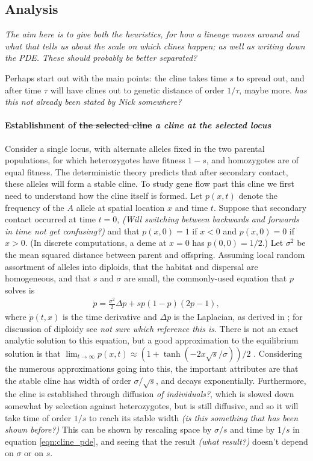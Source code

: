 \documentclass[12pt]{article}
\newcommand{\alisa}[1]{{\em \color{red} #1}}
\newcommand{\plr}[1]{{\em \color{blue} #1}}
\begin{document}
\subsection*{Analysis}

\plr{The aim here is to give both the heuristics, for how a lineage moves around
and what that tells us about the scale on which clines happen;
as well as writing down the PDE.  These should probably be better separated?}

Perhaps start out with the main points:
the cline takes time $s$ to spread out,
and after time $\tau$ will have clines out to genetic distance of order $1/\tau$,
maybe more. \alisa{has this not already been stated by Nick somewhere?}

\paragraph{Establishment of  \sout{the selected cline} \alisa{a cline at the selected locus}}
Consider a single locus, with alternate alleles fixed in the two parental populations,
for which heterozygotes have fitness $1-s$, and homozygotes are of equal fitness.
The deterministic theory predicts that after secondary contact,
these alleles will form a stable cline.
To study gene flow past this cline we first need to understand how the cline itself is formed.
Let $p(x,t)$ denote the frequency of the $A$ allele at spatial location $x$ and time $t$.  
Suppose that secondary contact occurred at time $t=0$, \alisa{(Will switching between backwards and forwards in time not get confusing?)}
and that $p(x,0) = 1$ if $x<0$ and $p(x,0)=0$ if $x>0$.
(In discrete computations, a deme at $x=0$ has $p(0,0)=1/2$.)
Let $\sigma^2$ be the mean squared distance between parent and offspring.
Assuming local random assortment of alleles into diploids,
that the habitat and dispersal are homogeneous,
and that $s$ and $\sigma$ are small, 
the commonly-used equation that $p$ solves is
\begin{align} \label{eqn:cline_pde}
    \dot p = \frac{\sigma^2}{2} \Delta p + s p (1-p) (2p-1) ,
\end{align}
where $\dot p(t,x)$ is the time derivative and $\Delta p$ is the Laplacian,
as derived in \citep{Bazykin1969}; for discussion of diploidy see \citep{diploidcline} \alisa{not sure which reference this is}.
There is not an exact analytic solution to this equation, 
but a good approximation to the equilibrium solution is that
$\lim_{t \to \infty} p(x,t) \approx (1+\tanh(-2x\sqrt{s}/\sigma))/2$ \citep{Bazykin1969}.
Considering the numerous approximations going into this,
the important attributes are that 
the stable cline has width of order $\sigma/\sqrt{s}$,
and decays exponentially.
Furthermore, the cline is established through diffusion \alisa{of individuals?}, which is slowed down somewhat by selection against heterozygotes,
but is still diffusive, and so it will take time of order $1/s$
to reach its stable width \alisa{(is this something that has been shown before?)} This can be shown by rescaling space by $\sigma/s$ and time by $1/s$ in equation \eqref{eqn:cline_pde}, and seeing that the result \alisa{(what result?)} doesn't depend on $\sigma$ or on $s$.
\end{document}
